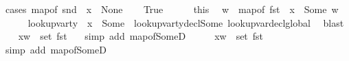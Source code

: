 \begin{isabellebody}
%
\isadelimproof
%
\endisadelimproof
%
\isatagproof
{}\isamarkupfalse%
\ {\isacharparenleft}{\kern0pt}cases\ {\isachardoublequoteopen}map{\isacharunderscore}{\kern0pt}of\ {\isacharparenleft}{\kern0pt}snd\ {\isasymLambda}{\isacharparenright}{\kern0pt}\ x\ {\isacharequal}{\kern0pt}\ None{\isachardoublequoteclose}{\isacharparenright}{\kern0pt}\isanewline
\ \ \isamarkupfalse%
\ True\ \ \isanewline
\ \ \isamarkupfalse%
\ this\ \isamarkupfalse%
\ w\ \ {\isachardoublequoteopen}map{\isacharunderscore}{\kern0pt}of\ {\isacharparenleft}{\kern0pt}fst\ {\isasymLambda}{\isacharparenright}{\kern0pt}\ x\ {\isacharequal}{\kern0pt}\ Some\ {\isacharparenleft}{\kern0pt}{\isasymtau}{\isacharcomma}{\kern0pt}w{\isacharparenright}{\kern0pt}{\isachardoublequoteclose}\isanewline
\ \ \ \ \isamarkupfalse%
\ {\isacartoucheopen}lookup{\isacharunderscore}{\kern0pt}var{\isacharunderscore}{\kern0pt}ty\ {\isasymLambda}\ x\ {\isacharequal}{\kern0pt}\ Some\ {\isasymtau}{\isacartoucheclose}\ lookup{\isacharunderscore}{\kern0pt}var{\isacharunderscore}{\kern0pt}ty{\isacharunderscore}{\kern0pt}decl{\isacharunderscore}{\kern0pt}Some\ lookup{\isacharunderscore}{\kern0pt}var{\isacharunderscore}{\kern0pt}decl{\isacharunderscore}{\kern0pt}global{\isacharunderscore}{\kern0pt}{}\ \isamarkupfalse%
\ blast\isanewline
\ \ \isamarkupfalse%
\ {\isachardoublequoteopen}{\isacharparenleft}{\kern0pt}x{\isacharcomma}{\kern0pt}{\isacharparenleft}{\kern0pt}{\isasymtau}{\isacharcomma}{\kern0pt}w{\isacharparenright}{\kern0pt}{\isacharparenright}{\kern0pt}\ {\isasymin}\ set\ {\isacharparenleft}{\kern0pt}fst\ {\isasymLambda}{\isacharparenright}{\kern0pt}{\isachardoublequoteclose}\ \isamarkupfalse%
\ {\isacharparenleft}{\kern0pt}simp\ add{\isacharcolon}{\kern0pt}\ map{\isacharunderscore}{\kern0pt}of{\isacharunderscore}{\kern0pt}SomeD{\isacharparenright}{\kern0pt}\isanewline
\ \ \isamarkupfalse%
\ \isamarkupfalse%
\ {\isachardoublequoteopen}{\isacharparenleft}{\kern0pt}x{\isacharcomma}{\kern0pt}{\isacharparenleft}{\kern0pt}{\isasymtau}{\isacharcomma}{\kern0pt}w{\isacharparenright}{\kern0pt}{\isacharparenright}{\kern0pt}\ {\isasymin}\ set\ {\isacharparenleft}{\kern0pt}fst\ {\isasymLambda}{\isacharparenright}{\kern0pt}{\isachardoublequoteclose}\ \isamarkupfalse%
\ {\isacharparenleft}{\kern0pt}simp\ add{\isacharcolon}{\kern0pt}\ map{\isacharunderscore}{\kern0pt}of{\isacharunderscore}{\kern0pt}SomeD{\isacharparenright}{\kern0pt}\ \isanewline

\end{isabellebody}
